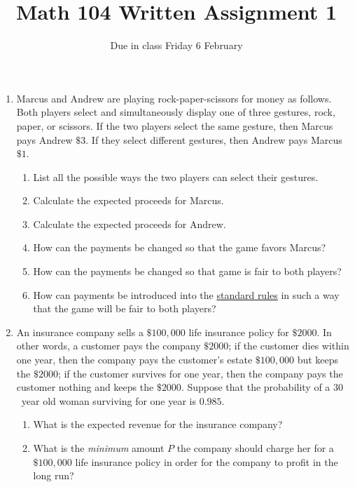 \documentclass[12pt]{article}
\author{}\date{Due in class Friday 6 February}
\title{Math 104 Written Assignment 1}\author{}
\begin{document}
\maketitle
\pagestyle{empty}

\begin{enumerate}
\item Marcus and Andrew are playing rock-paper-scissors
for money as follows. Both players select and simultaneously display
one of three gestures, rock, paper, or scissors.
If the two players select the same gesture, then Marcus pays Andrew 
$\$3$. If they select different gestures, then Andrew pays Marcus $\$1$.
\begin{enumerate}
\item List all the possible ways
the two players can select their gestures.
\vspace{.6in}
\item Calculate the expected proceeds for Marcus.
\vspace{.6in}
\item Calculate the expected proceeds for Andrew.
\vspace{.6in}
\item How can the payments be changed so that the game favors Marcus?
\vspace{.6in}
\item How can the payments be changed so that game is fair to both
players?
\vspace{.6in}
\item How can payments be introduced into the
\href{http://en.wikipedia.org/wiki/Rock-paper-scissors}{standard rules}
in such a way that the game will be fair to both players?
\end{enumerate}
\newpage

\item An insurance company sells a $\$100,000$
life insurance policy for $\$2000$. 
In other words, a customer pays the company $\$2000$;
if the customer dies within one year, then the company
pays the customer's estate $\$100,000$ but keeps the $\$2000$;
if the customer survives for one year, then
the company pays the customer nothing and keeps the $\$2000$. 
Suppose that the probability of a $30$~year old woman surviving
for one year is $0.985$.
\begin{enumerate}
\item What is the expected revenue for the insurance company?
\vspace{2in}
\item What is the {\em minimum} amount $P$ the
company should charge her for a $\$100,000$ life
insurance policy in order
for the company to profit in the long run?
\end{enumerate}
\end{enumerate}
\end{document}
